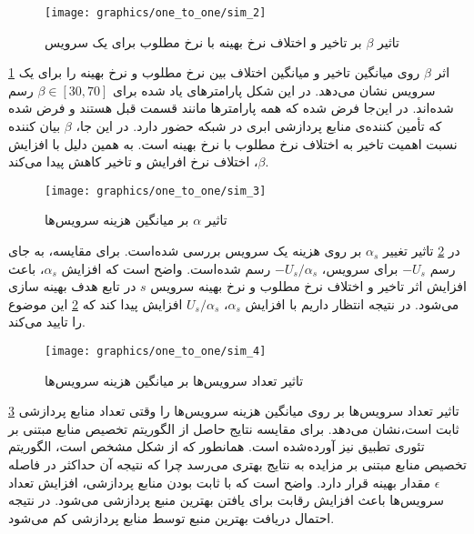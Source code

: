     \begin{figure}
      \centerline{\texttt{[image: graphics/one\_to\_one/sim\_2]}}
      \caption{تاثیر $\beta$ بر تاخیر و اختلاف نرخ بهینه با نرخ مطلوب برای یک سرویس}
      \label{fig:ono_to_one:sim2}
    \end{figure}

    \cref{fig:ono_to_one:sim2} اثر $\beta$ روی میانگین تاخیر و میانگین اختلاف بین نرخ مطلوب و نرخ بهینه را برای یک سرویس نشان می‌دهد.
    در این شکل پارامتر‌های یاد شده برای $\beta \in [30, 70]$ رسم شده‌اند.
    در این‌جا فرض شده که همه پارامتر‌ها مانند قسمت قبل هستند و فرض شده که تأمین کننده‌ی منابع پردازشی ابری در شبکه حضور دارد.
    در این جا، $\beta$ بیان کننده نسبت اهمیت تاخیر به اختلاف نرخ مطلوب با نرخ بهینه است.
    به همین دلیل با افزایش $\beta$، اختلاف نرخ افرایش و تاخیر کاهش پیدا می‌کند.
    
    \begin{figure}
      \centerline{\texttt{[image: graphics/one\_to\_one/sim\_3]}}
      \caption{تاثیر $\alpha$ بر میانگین هزینه سرویس‌ها}
      \label{fig:ono_to_one:sim3}
    \end{figure}

    در \cref{fig:ono_to_one:sim3} تاثیر تغییر $\alpha_s$ بر روی هزینه یک سرویس‌ بررسی شده‌است.
    برای مقایسه، به جای رسم $-U_s$ برای سرویس، $-U_s/\alpha_s$ رسم شده‌است.
    واضح است که افزایش $\alpha_s$، باعث افزایش اثر تاخیر و اختلاف نرخ مطلوب و نرخ بهینه سرویس $s$ در تابع هدف بهینه سازی می‌شود.
    در نتیجه انتظار داریم با افزایش $\alpha_s$، $U_s/\alpha_s$ افزایش پیدا کند که \cref{fig:ono_to_one:sim3} این موضوع را تایید می‌کند.

    \begin{figure}
      \centerline{\texttt{[image: graphics/one\_to\_one/sim\_4]}}
      \caption{تاثیر تعداد سرویس‌ها بر میانگین هزینه سرویس‌ها}
      \label{fig:ono_to_one:sim4}
    \end{figure}

    \cref{fig:ono_to_one:sim4} تاثیر تعداد سرویس‌ها بر روی میانگین هزینه سرویس‌ها را وقتی تعداد منابع پردازشی ثابت است،‌نشان می‌دهد.
    برای مقایسه نتایج حاصل از الگوریتم تخصیص منابع مبتنی بر تئوری تطبیق نیز آورده‌شده است.
    همانطور که از شکل مشخص است، الگوریتم تخصیص منابع مبتنی بر مزایده به نتایج بهتری می‌رسد چرا که نتیجه آن حداکثر در فاصله $\epsilon$ مقدار بهینه قرار دارد.
    واضح است که با ثابت بودن منابع پردازشی، افزایش تعداد سرویس‌ها باعث افزایش رقابت برای یافتن بهترین منبع پردازشی می‌شود.
    در نتیجه احتمال دریافت بهترین منبع توسط منابع پردازشی کم‌ می‌شود.


